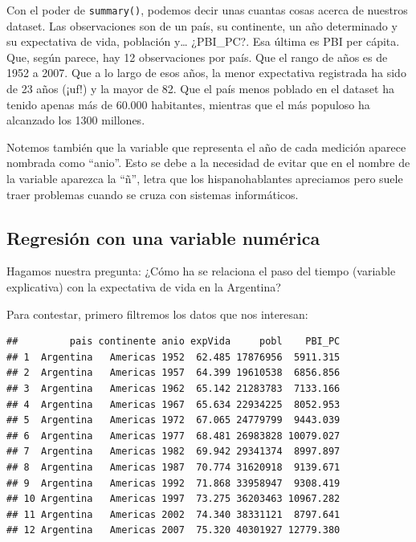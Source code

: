 \documentclass[spanish,]{book}
\newenvironment{Shaded}{\begin{snugshade}}{\end{snugshade}}
\newcommand{\KeywordTok}[1]{\textcolor[rgb]{0.13,0.29,0.53}{\textbf{#1}}}
\newcommand{\NormalTok}[1]{#1}
\newcommand{\OperatorTok}[1]{\textcolor[rgb]{0.81,0.36,0.00}{\textbf{#1}}}
\newcommand{\StringTok}[1]{\textcolor[rgb]{0.31,0.60,0.02}{#1}}
\begin{document}
Con el poder de \texttt{summary()}, podemos decir unas cuantas cosas acerca de nuestros dataset. Las observaciones son de un país, su continente, un año determinado y su expectativa de vida, población y\ldots{} ¿PBI\_PC?. Esa última es PBI per cápita. Que, según parece, hay 12 observaciones por país. Que el rango de años es de 1952 a 2007. Que a lo largo de esos años, la menor expectativa registrada ha sido de 23 años (¡uf!) y la mayor de 82. Que el país menos poblado en el dataset ha tenido apenas más de 60.000 habitantes, mientras que el más populoso ha alcanzado los 1300 millones.

Notemos también que la variable que representa el año de cada medición aparece nombrada como ``anio''. Esto se debe a la necesidad de evitar que en el nombre de la variable aparezca la ``ñ'', letra que los hispanohablantes apreciamos pero suele traer problemas cuando se cruza con sistemas informáticos.

\hypertarget{regresiuxf3n-con-una-variable-numuxe9rica}{%
\subsection{Regresión con una variable numérica}\label{regresiuxf3n-con-una-variable-numuxe9rica}}

Hagamos nuestra pregunta: ¿Cómo ha se relaciona el paso del tiempo (variable explicativa) con la expectativa de vida en la Argentina?

Para contestar, primero filtremos los datos que nos interesan:

\begin{Shaded}
\end{Shaded}

\begin{verbatim}
##         pais continente anio expVida     pobl    PBI_PC
## 1  Argentina   Americas 1952  62.485 17876956  5911.315
## 2  Argentina   Americas 1957  64.399 19610538  6856.856
## 3  Argentina   Americas 1962  65.142 21283783  7133.166
## 4  Argentina   Americas 1967  65.634 22934225  8052.953
## 5  Argentina   Americas 1972  67.065 24779799  9443.039
## 6  Argentina   Americas 1977  68.481 26983828 10079.027
## 7  Argentina   Americas 1982  69.942 29341374  8997.897
## 8  Argentina   Americas 1987  70.774 31620918  9139.671
## 9  Argentina   Americas 1992  71.868 33958947  9308.419
## 10 Argentina   Americas 1997  73.275 36203463 10967.282
## 11 Argentina   Americas 2002  74.340 38331121  8797.641
## 12 Argentina   Americas 2007  75.320 40301927 12779.380
\end{verbatim}
\end{document}
